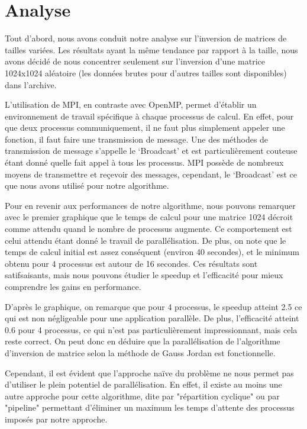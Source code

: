 \documentclass[a4paper, french]{article}
\begin{document}
\newpage

\section{Analyse}

Tout d'abord, nous avons conduit notre analyse sur l'inversion de matrices de tailles variées. Les
résultats ayant la même tendance par rapport à la taille, nous avons décidé de nous concentrer seulement
sur l'inversion d'une matrice 1024x1024 aléatoire (les données brutes pour d'autres tailles sont
disponibles) dans l'archive.

L'utilisation de MPI, en contraste avec OpenMP, permet d'établir un environnement de travail spécifique
à chaque processus de calcul. En effet, pour que deux processus communiquement, il ne faut plus simplement
appeler une fonction, il faut faire une transmission de message. Une des méthodes de transmission de message
s'appelle le `Broadcast' et est particulièrement couteuse étant donné quelle fait appel à tous les processus.
MPI possède de nombreux moyens de transmettre et reçevoir des messages, cependant, le `Broadcast' est ce que
nous avons utilisé pour notre algorithme.

Pour en revenir aux performances de notre algorithme, nous pouvons remarquer avec le premier graphique
que le temps de calcul pour une matrice 1024 décroit comme attendu quand le nombre de processus augmente.
Ce comportement est celui attendu étant donné le travail de parallélisation. De plus, on note que le temps
de calcul initial est assez conséquent (environ 40 secondes), et le minimum obtenu pour 4 processus est
autour de 16 secondes. Ces résultats sont satifsaisants, mais nous pouvons étudier le speedup et l'efficacité
pour mieux comprendre les gains en performance.

D'après le graphique, on remarque que pour 4 processus, le speedup atteint 2.5 ce qui est non négligeable pour
une application parallèle. De plus, l'efficacité atteint 0.6 pour 4 processus, ce qui n'est pas particulièrement
impressionnant, mais cela reste correct. On peut donc en déduire que la parallélisation de l'algorithme d'inversion
de matrice selon la méthode de Gauss Jordan est fonctionnelle.

Cependant, il est évident que l'approche naïve du problème ne nous permet pas d'utiliser le plein potentiel de
parallélisation. En effet, il existe au moins une autre approche pour cette algorithme, dite par "répartition
cyclique" ou par "pipeline" permettant d'éliminer un maximum les temps d'attente des processus imposés par notre
approche.
\end{document}
